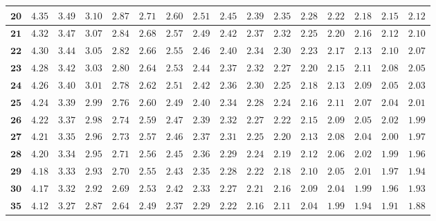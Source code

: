\begin{longtable}{|r|r|r|r|r|r|r|r|r|r|r|r|r|r|r|r|}
    \(\mathbf{20}\) & \(4.35\) & \(3.49\) & \(3.10\) & \(2.87\) & \(2.71\) & \(2.60\) & \(2.51\) & \(2.45\) & \(2.39\) & \(2.35\) & \(2.28\) & \(2.22\) & \(2.18\) & \(2.15\) & \(2.12\) \\ \hline
    \(\mathbf{21}\) & \(4.32\) & \(3.47\) & \(3.07\) & \(2.84\) & \(2.68\) & \(2.57\) & \(2.49\) & \(2.42\) & \(2.37\) & \(2.32\) & \(2.25\) & \(2.20\) & \(2.16\) & \(2.12\) & \(2.10\) \\ \hline
    \(\mathbf{22}\) & \(4.30\) & \(3.44\) & \(3.05\) & \(2.82\) & \(2.66\) & \(2.55\) & \(2.46\) & \(2.40\) & \(2.34\) & \(2.30\) & \(2.23\) & \(2.17\) & \(2.13\) & \(2.10\) & \(2.07\) \\ \hline
    \(\mathbf{23}\) & \(4.28\) & \(3.42\) & \(3.03\) & \(2.80\) & \(2.64\) & \(2.53\) & \(2.44\) & \(2.37\) & \(2.32\) & \(2.27\) & \(2.20\) & \(2.15\) & \(2.11\) & \(2.08\) & \(2.05\) \\ \hline
    \(\mathbf{24}\) & \(4.26\) & \(3.40\) & \(3.01\) & \(2.78\) & \(2.62\) & \(2.51\) & \(2.42\) & \(2.36\) & \(2.30\) & \(2.25\) & \(2.18\) & \(2.13\) & \(2.09\) & \(2.05\) & \(2.03\) \\ \hline
    \(\mathbf{25}\) & \(4.24\) & \(3.39\) & \(2.99\) & \(2.76\) & \(2.60\) & \(2.49\) & \(2.40\) & \(2.34\) & \(2.28\) & \(2.24\) & \(2.16\) & \(2.11\) & \(2.07\) & \(2.04\) & \(2.01\) \\ \hline
    \(\mathbf{26}\) & \(4.22\) & \(3.37\) & \(2.98\) & \(2.74\) & \(2.59\) & \(2.47\) & \(2.39\) & \(2.32\) & \(2.27\) & \(2.22\) & \(2.15\) & \(2.09\) & \(2.05\) & \(2.02\) & \(1.99\) \\ \hline
    \(\mathbf{27}\) & \(4.21\) & \(3.35\) & \(2.96\) & \(2.73\) & \(2.57\) & \(2.46\) & \(2.37\) & \(2.31\) & \(2.25\) & \(2.20\) & \(2.13\) & \(2.08\) & \(2.04\) & \(2.00\) & \(1.97\) \\ \hline
    \(\mathbf{28}\) & \(4.20\) & \(3.34\) & \(2.95\) & \(2.71\) & \(2.56\) & \(2.45\) & \(2.36\) & \(2.29\) & \(2.24\) & \(2.19\) & \(2.12\) & \(2.06\) & \(2.02\) & \(1.99\) & \(1.96\) \\ \hline
    \(\mathbf{29}\) & \(4.18\) & \(3.33\) & \(2.93\) & \(2.70\) & \(2.55\) & \(2.43\) & \(2.35\) & \(2.28\) & \(2.22\) & \(2.18\) & \(2.10\) & \(2.05\) & \(2.01\) & \(1.97\) & \(1.94\) \\ \hline
    \(\mathbf{30}\) & \(4.17\) & \(3.32\) & \(2.92\) & \(2.69\) & \(2.53\) & \(2.42\) & \(2.33\) & \(2.27\) & \(2.21\) & \(2.16\) & \(2.09\) & \(2.04\) & \(1.99\) & \(1.96\) & \(1.93\) \\ \hline
    \(\mathbf{35}\) & \(4.12\) & \(3.27\) & \(2.87\) & \(2.64\) & \(2.49\) & \(2.37\) & \(2.29\) & \(2.22\) & \(2.16\) & \(2.11\) & \(2.04\) & \(1.99\) & \(1.94\) & \(1.91\) & \(1.88\) \\ \hline

\end{longtable}
